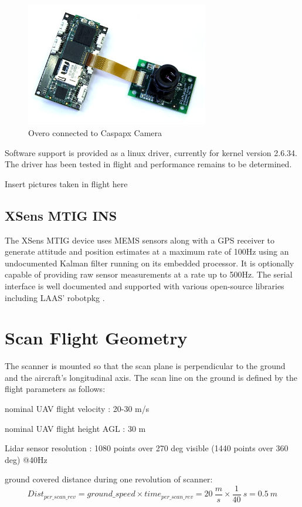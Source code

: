 \documentclass[a4paper,11pt]{report}
\begin{document}
\begin{figure}[ht]
 \centering
 \includegraphics[width=8cm]{overo_and_caspa.jpeg}
 \caption{Overo connected to Caspapx Camera}
 \label{fig:caspa}
\end{figure}

Software support is provided as a linux driver, currently for kernel version 2.6.34. The driver has been tested in flight and performance remains to be determined.

Insert pictures taken in flight here

\subsection{XSens MTIG INS}
\label{MTIG}

The XSens MTIG device uses MEMS sensors along with a GPS receiver to generate attitude and position estimates at a maximum rate of 100Hz using an undocumented Kalman filter running on its embedded processor. It is optionally capable of providing raw sensor measurements at a rate up to 500Hz. The serial interface is well documented and supported with various open-source libraries including LAAS' robotpkg \cite{robotpkg}.


\section{Scan Flight Geometry}
\label{geometry}

The scanner is mounted so that the scan plane is perpendicular to the ground and the aircraft's longitudinal axis. The scan line on the ground is defined by the flight parameters as follows:

nominal UAV flight velocity : 20-30 m/s

nominal UAV flight height AGL : 30 m

Lidar sensor resolution : 1080 points over 270 deg visible (1440 points over 360 deg) @40Hz

ground covered distance during one revolution of scanner:
\begin{equation}
Dist_{per\_scan\_rev} = ground\_speed \times time_{per\_scan\_rev} = 20~\frac{m}{s} \times \frac{1}{40}~s = 0.5~m 
\end{equation}
\end{document}
